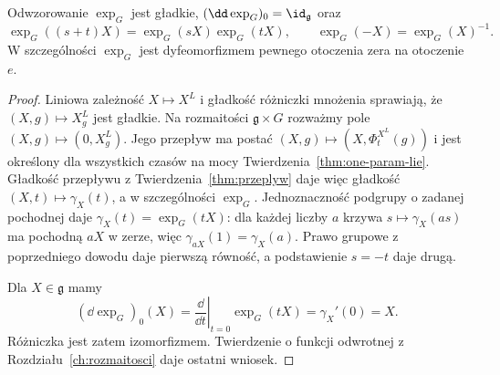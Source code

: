 \begin{stwierdzenie}
\label{prop:lie-exp-properties}
Odwzorowanie $\exp_G$ jest gładkie,
$(\dd\exp_G)_0=\id_{\mathfrak g}$ oraz
\[
 \exp_G((s+t)X)=\exp_G(sX)\exp_G(tX),\qquad
 \exp_G(-X)=\exp_G(X)^{-1}.
\]
W szczególności $\exp_G$ jest dyfeomorfizmem pewnego
otoczenia zera na otoczenie $e$.
\end{stwierdzenie}
\begin{proof}
Liniowa zależność $X\mapsto X^L$ i gładkość różniczki
mnożenia sprawiają, że $(X,g)\mapsto X^L_g$ jest
gładkie. Na rozmaitości $\mathfrak g\times G$ rozważmy
pole $(X,g)\mapsto(0,X^L_g)$. Jego przepływ ma postać
$(X,g)\mapsto(X,\Phi_t^{X^L}(g))$ i jest określony
dla wszystkich czasów na mocy
Twierdzenia~\ref{thm:one-param-lie}. Gładkość przepływu
z Twierdzenia~\ref{thm:przeplyw} daje więc gładkość
$(X,t)\mapsto\gamma_X(t)$, a w szczególności $\exp_G$.
Jednoznaczność podgrupy o zadanej pochodnej
daje $\gamma_X(t)=\exp_G(tX)$: dla każdej liczby $a$
krzywa $s\mapsto\gamma_X(as)$ ma pochodną $aX$ w zerze,
więc $\gamma_{aX}(1)=\gamma_X(a)$.
Prawo grupowe z poprzedniego dowodu daje pierwszą równość,
a podstawienie $s=-t$ daje drugą.

Dla $X\in\mathfrak g$ mamy
\[
 (\dd\exp_G)_0(X)
 =\left.\frac{\dd}{\dd t}\right|_{t=0}\exp_G(tX)
 =\gamma_X'(0)=X.
\]
Różniczka jest zatem izomorfizmem. Twierdzenie o funkcji
odwrotnej z Rozdziału~\ref{ch:rozmaitosci} daje ostatni wniosek.
\end{proof}

